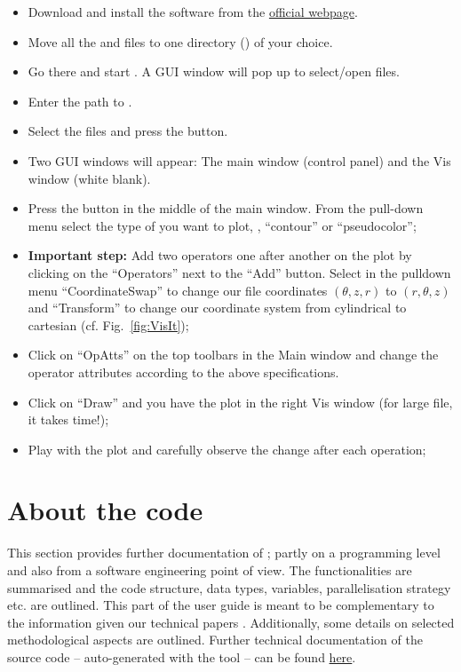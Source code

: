 \documentclass[a4paper, 11pt, DIV=11]{scrartcl}
\begin{document}
\begin{itemize}
\item Download and install the software from the \href{https://wci.llnl.gov/simulation/computer-codes/visit}{official webpage}.
\item Move all the  and  files to one directory () of your choice.
\item Go there and start \visit. A GUI window will pop up to select/open files.
\item Enter the path to .
\item Select the  files and press the  button.
\item Two GUI windows will appear: The \visit main window (control panel) and the Vis window (white blank).
\item Press the  button in the middle of the main window. From the
pull-down menu select the type of you want to plot, \textit{\eg}, ``contour'' or ``pseudocolor'';
  \item  \textbf{Important step:} Add two operators one after another on the plot by clicking on the ``Operators'' next to the ``Add'' button. 
 Select in the pulldown menu ``CoordinateSwap'' to change our file coordinates $(\theta,z,r)$ to $(r,\theta,z)$ 
 and ``Transform'' to change our coordinate system from
 cylindrical to cartesian (cf. Fig.~\ref{fig:VisIt}); 
  \item  Click on ``OpAtts'' on the top toolbars in the Main window and change the operator attributes according to the above specifications.
  \item  Click on ``Draw'' and you have the plot in the right Vis window (for large file, it takes time!);
  \item  Play with the plot and carefully observe the change after each operation;
\end{itemize} 



\section{About the code}
\label{sec:aboutTheCode}

This section provides further documentation of \nsc; partly on a programming
level and also from a software engineering point of view. The functionalities
are summarised and the code structure, data types, variables, parallelisation
strategy etc. are outlined. This part of the user guide is meant to be
complementary to the information given our technical papers \cite{}. Additionally,
some details on selected methodological aspects are outlined. Further
technical documentation of the source code -- auto-generated with the
 tool -- can be found
\href{http://mjr.pages.mpcdf.de/nscouette/ford-doc/}{here}.
\end{document}
